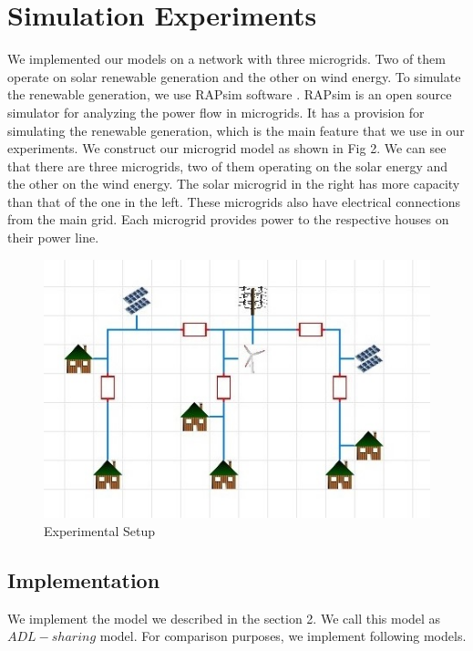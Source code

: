 \section{Simulation Experiments}\label{sec:experiments}
We implemented our models on a network with three microgrids. Two of them  operate on solar renewable generation and the other on wind energy. To simulate the renewable generation, we use RAPsim software \cite{rapsim}. RAPsim is an open source simulator for analyzing the power flow in microgrids. It has a provision for simulating the renewable generation, which is the main feature that we use in our experiments. We construct our microgrid model as shown in Fig 2. We can see that there are three microgrids, two of them operating on the solar energy and the other on the wind energy. The solar microgrid in the right has more capacity than that of the one in the left. These microgrids also have electrical connections from the main grid. Each microgrid provides power to the respective houses on their power line. 


\begin{figure}[thbp] \label{exp}
	\centering
	\includegraphics[scale = 0.6]{experimental_setup.jpg}
		\caption{Experimental Setup}
\end{figure}


\subsection{Implementation}

We implement the model we described in the section 2. We call this model as $ADL-sharing$ model. For comparison purposes, we implement following models. 


